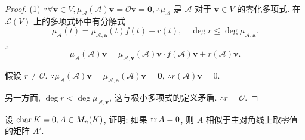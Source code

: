 \documentclass[color=black,device=normal,lang=cn,mode=geye]{elegantnote}
\begin{document}
\begin{proof}
    (1) $\because\forall\boldsymbol{v}\in V,\mu_{\mathcal{A}}(\mathcal{A})\boldsymbol{v}=\mathcal{O}\boldsymbol{v}=\boldsymbol{0},\therefore\mu_{\mathcal{A}}$ 是 $\mathcal{A}$ 对于 $\boldsymbol{v}\in V$ 的零化多项式. 在 $\mathcal{L}(V)$ 上的多项式环中有分解式
    \[\mu_{\mathcal{A}}(t)=\mu_{\mathcal{A},\boldsymbol{a}}(t)f(t)+r(t),\quad\deg r\leq\deg\mu_{\mathcal{A},\boldsymbol{a}}.\]

    $\therefore$
    \[\mu_{\mathcal{A}}(\mathcal{A})\boldsymbol{v}=\mu_{\mathcal{A},\boldsymbol{v}}(\mathcal{A})\boldsymbol{v}\cdot f(\mathcal{A})\boldsymbol{v}+r(\mathcal{A})\boldsymbol{v}.\]

    假设 $r\neq\mathcal{O}$. $\because\mu_{\mathcal{A}}(\mathcal{A})\boldsymbol{v}=\mu_{\mathcal{A},\boldsymbol{a}}(\mathcal{A})\boldsymbol{v}=\boldsymbol{0}$, $\therefore r(\mathcal{A})\boldsymbol{v}=0$.
    
    另一方面, $\deg r<\deg\mu_{\mathcal{A},\boldsymbol{v}}$, 这与极小多项式的定义矛盾. $\therefore r=\mathcal{O}$.
\end{proof}
\begin{exercise}\label{ex2.11}
    设 $\operatorname{char} K=0,A\in M_n(K)$, 证明: 如果 $\operatorname{tr} A=0$, 则 $A$ 相似于主对角线上取零值的矩阵 $A'$.
\end{exercise}
\end{document}
